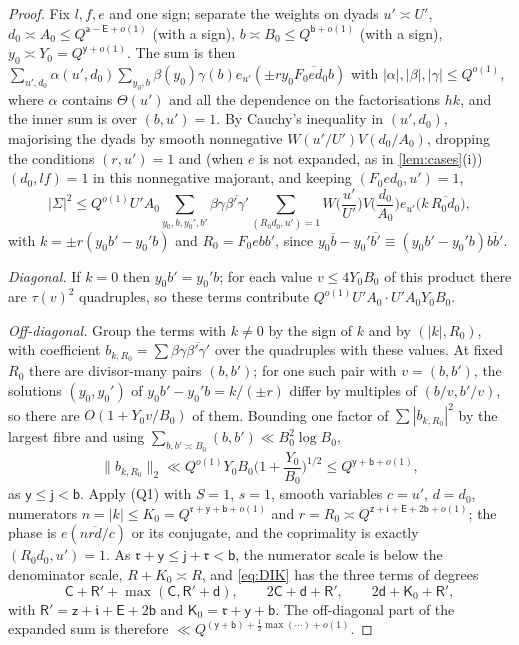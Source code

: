 \documentclass[11pt,colorlinks]{charlie}
\begin{document}
\begin{proof}
Fix $l,f,e$ and one sign; separate the weights on dyads $u'\asymp U'$, $d_0\asymp A_0\le Q^{\mathsf a-\mathsf E+o(1)}$ (with a sign), $b\asymp B_0\le Q^{\mathsf b+o(1)}$ (with a sign), $y_0\asymp Y_0=Q^{\mathsf y+o(1)}$. The sum is then $\sum_{u',d_0}\alpha(u',d_0)\sum_{y_0,b}\beta(y_0)\gamma(b)e_{u'}(\pm ry_0\overline{F_0ed_0b})$ with $|\alpha|,|\beta|,|\gamma|\le Q^{o(1)}$, where $\alpha$ contains $\Theta(u')$ and all the dependence on the factorisations $hk$, and the inner sum is over $(b,u')=1$. By Cauchy's inequality in $(u',d_0)$, majorising the dyads by smooth nonnegative $W(u'/U')V(d_0/A_0)$, dropping the conditions $(r,u')=1$ and (when $e$ is not expanded, as in \cref{lem:cases}(i)) $(d_0,lf)=1$ in this nonnegative majorant, and keeping $(F_0ed_0,u')=1$,
\[
 |\Sigma|^2\le Q^{o(1)}U'A_0\sum_{y_0,b,y_0',b'}\beta\gamma\overline{\beta'\gamma'}\sum_{(R_0d_0,u')=1}W\Big(\frac{u'}{U'}\Big)V\Big(\frac{d_0}{A_0}\Big)e_{u'}\big(k\,\overline{R_0d_0}\big),
\]
with $k=\pm r(y_0b'-y_0'b)$ and $R_0=F_0ebb'$, since $y_0\overline b-y_0'\overline{b'}\equiv(y_0b'-y_0'b)\overline{bb'}$.

\emph{Diagonal.} If $k=0$ then $y_0b'=y_0'b$; for each value $v\le4Y_0B_0$ of this product there are $\tau(v)^2$ quadruples, so these terms contribute $Q^{o(1)}U'A_0\cdot U'A_0Y_0B_0$.

\emph{Off-diagonal.} Group the terms with $k\ne0$ by the sign of $k$ and by $(|k|,R_0)$, with coefficient $b_{k,R_0}=\sum\beta\gamma\overline{\beta'\gamma'}$ over the quadruples with these values. At fixed $R_0$ there are divisor-many pairs $(b,b')$; for one such pair with $v=(b,b')$, the solutions $(y_0,y_0')$ of $y_0b'-y_0'b=k/(\pm r)$ differ by multiples of $(b/v,b'/v)$, so there are $O(1+Y_0v/B_0)$ of them. Bounding one factor of $\sum|b_{k,R_0}|^2$ by the largest fibre and using $\sum_{b,b'\asymp B_0}(b,b')\ll B_0^2\log B_0$,
\[
 \|b_{k,R_0}\|_2\ll Q^{o(1)}Y_0B_0\Big(1+\frac{Y_0}{B_0}\Big)^{1/2}\le Q^{\mathsf y+\mathsf b+o(1)},
\]
as $\mathsf y\le\mathsf j<\mathsf b$. Apply (Q1) with $S=1$, $s=1$, smooth variables $c=u'$, $d=d_0$, numerators $n=|k|\le K_0=Q^{\mathfrak r+\mathsf y+\mathsf b+o(1)}$ and $r=R_0\asymp Q^{\mathsf z+\mathfrak i+\mathsf E+2\mathsf b+o(1)}$; the phase is $e(n\overline{rd}/c)$ or its conjugate, and the coprimality is exactly $(R_0d_0,u')=1$. As $\mathfrak r+\mathsf y\le\mathsf j+\mathfrak r<\mathsf b$, the numerator scale is below the denominator scale, $R+K_0\asymp R$, and \eqref{eq:DIK} has the three terms of degrees
\[
 \mathsf C+\mathsf R'+\max(\mathsf C,\mathsf R'+\mathsf d),\qquad2\mathsf C+\mathsf d+\mathsf R',\qquad2\mathsf d+\mathsf K_0+\mathsf R',
\]
with $\mathsf R'=\mathsf z+\mathfrak i+\mathsf E+2\mathsf b$ and $\mathsf K_0=\mathfrak r+\mathsf y+\mathsf b$. The off-diagonal part of the expanded sum is therefore $\ll Q^{(\mathsf y+\mathsf b)+\frac12\max(\cdots)+o(1)}$.


\end{proof}
\end{document}
